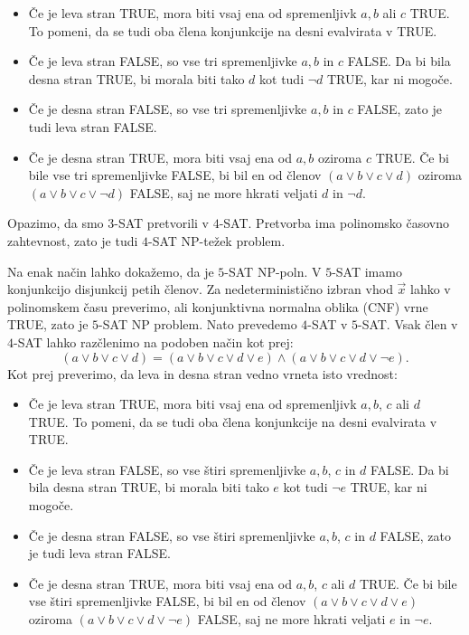 \documentclass{article}
\begin{document}
    \begin{itemize}
        \item Če je leva stran TRUE, mora biti vsaj ena od spremenljivk $a, b$ ali $c$ TRUE. To pomeni, da se tudi oba člena konjunkcije na desni evalvirata v TRUE. 
        \item Če je leva stran FALSE, so vse tri spremenljivke $a, b$ in $c$ FALSE. Da bi bila desna stran TRUE, bi morala biti tako $d$ kot tudi $\neg d$ TRUE, kar ni mogoče.
        \item Če je desna stran FALSE, so vse tri spremenljivke $a, b$ in $c$ FALSE, zato je tudi leva stran FALSE.
        \item Če je desna stran TRUE, mora biti vsaj ena od $a, b$ oziroma $c$ TRUE. Če bi bile vse tri spremenljivke FALSE, bi bil en od členov $(a \vee b \vee c \vee d)$ oziroma $(a \vee b \vee c \vee \neg d)$ FALSE, saj ne more hkrati veljati $d$ in $\neg d$.
    \end{itemize}
    Opazimo, da smo $3$-SAT pretvorili v $4$-SAT. Pretvorba ima polinomsko časovno zahtevnost, zato je tudi $4$-SAT NP-težek problem.
    
    Na enak način lahko dokažemo, da je $5$-SAT NP-poln. V $5$-SAT imamo konjunkcijo disjunkcij petih členov. Za nedeterministično izbran vhod $\vec{x}$ lahko v polinomskem času preverimo, ali konjunktivna normalna oblika (CNF) vrne TRUE, zato je $5$-SAT NP problem.
    Nato prevedemo $4$-SAT v $5$-SAT. Vsak člen v $4$-SAT lahko razčlenimo na podoben način kot prej:
    \[ (a \vee b \vee c \vee d) = (a \vee b \vee c \vee d \vee e) \wedge (a \vee b \vee c \vee d \vee \neg e) \text{.} \]
    Kot prej preverimo, da leva in desna stran vedno vrneta isto vrednost:
    \begin{itemize}
        \item Če je leva stran TRUE, mora biti vsaj ena od spremenljivk $a, b$, $c$ ali $d$ TRUE. To pomeni, da se tudi oba člena konjunkcije na desni evalvirata v TRUE. 
        \item Če je leva stran FALSE, so vse štiri spremenljivke $a, b$, $c$ in $d$ FALSE. Da bi bila desna stran TRUE, bi morala biti tako $e$ kot tudi $\neg e$ TRUE, kar ni mogoče.
        \item Če je desna stran FALSE, so vse štiri spremenljivke $a, b$, $c$ in $d$ FALSE, zato je tudi leva stran FALSE.
        \item Če je desna stran TRUE, mora biti vsaj ena od $a, b$, $c$ ali $d$ TRUE. Če bi bile vse štiri spremenljivke FALSE, bi bil en od členov $(a \vee b \vee c \vee d \vee e)$ oziroma $(a \vee b \vee c \vee d \vee \neg e)$ FALSE, saj ne more hkrati veljati $e$ in $\neg e$.
    \end{itemize}
    
\end{document}
